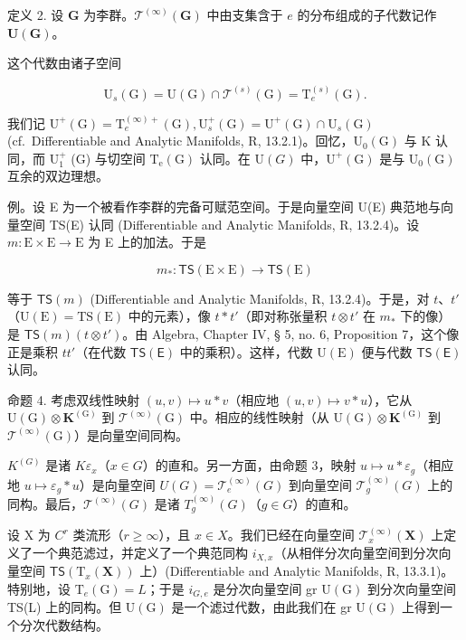 定义 2. 设 \(\mathbf{G}\) 为李群。\(\mathcal{T}^{(\infty)}(\mathbf{G})\) 中由支集含于 \(e\) 的分布组成的子代数记作 \(\mathbf{U}(\mathbf{G})\)。

这个代数由诸子空间

\[
\mathrm{U} _ {s} (\mathrm{G}) = \mathrm{U} (\mathrm{G}) \cap \mathcal {T} ^ {(s)} (\mathrm{G}) = \mathrm{T} _ {e} ^ {(s)} (\mathrm{G}).
\]

我们记 \(\mathrm{U}^{+}(\mathrm{G}) = \mathrm{T}_{e}^{(\infty)+}(\mathrm{G}),\mathrm{U}_{s}^{+}(\mathrm{G}) = \mathrm{U}^{+}(\mathrm{G})\cap \mathrm{U}_{s}(\mathrm{G})\) (cf.~Differentiable and Analytic Manifolds, R, 13.2.1)。回忆，\(\mathrm{U}_0(\mathrm{G})\) 与 K 认同，而 \(\mathrm{U}_1^+\) (G) 与切空间 \(\mathrm{T_e(G)}\) 认同。在 \(\mathrm{U}(G)\) 中，\(\mathrm{U}^{+}(\mathrm{G})\) 是与 \(\mathrm{U}_0(\mathrm{G})\) 互余的双边理想。

例。设 E 为一个被看作李群的完备可赋范空间。于是向量空间 U(E) 典范地与向量空间 TS(E) 认同 (Differentiable and Analytic Manifolds, R, 13.2.4)。设 \(m: \mathrm{E} \times \mathrm{E} \to \mathrm{E}\) 为 E 上的加法。于是

\[
m _ {*} \colon \mathsf {T S} (\mathrm{E} \times \mathrm{E}) \rightarrow \mathsf {T S} (\mathrm{E})
\]

等于 \(\mathsf{TS}(m)\) (Differentiable and Analytic Manifolds, R, 13.2.4)。于是，对 \(t\)、\(t'\)（\(\mathrm{U(E)} = \mathrm{TS(E)}\) 中的元素），像 \(t * t'\)（即对称张量积 \(t \otimes t'\) 在 \(m_*\) 下的像）是 \(\mathsf{TS}(m)(t \otimes t')\)。由 Algebra, Chapter IV, § 5, no. 6, Proposition 7，这个像正是乘积 \(tt'\)（在代数 \(\mathsf{TS(E)}\) 中的乘积）。这样，代数 \(\mathrm{U(E)}\) 便与代数 \(\mathsf{TS(E)}\) 认同。

命题 4. 考虑双线性映射 \((u,v)\mapsto u*v\)（相应地 \((u,v)\mapsto v*u\)），它从 \(\mathrm{U}(\mathrm{G})\otimes \mathbf{K}^{(\mathrm{G})}\) 到 \(\mathcal{T}^{(\infty)}(\mathrm{G})\) 中。相应的线性映射（从 \(\mathrm{U}(\mathrm{G})\otimes \mathbf{K}^{(\mathrm{G})}\) 到 \(\mathcal{T}^{(\infty)}(\mathrm{G})\)）是向量空间同构。

\(K^{(G)}\) 是诸 \(K\varepsilon_{x}\)（\(x\in G\)）的直和。另一方面，由命题 3，映射 \(u\mapsto u*\varepsilon_{g}\)（相应地 \(u\mapsto\varepsilon_{g}*u\)）是向量空间 \(U(G)=\mathcal{T}_{e}^{(\infty)}(G)\) 到向量空间 \(\mathcal{T}_{g}^{(\infty)}(G)\) 上的同构。最后，\(\mathcal{T}^{(\infty)}(G)\) 是诸 \(T_{g}^{(\infty)}(G)\)（\(g\in G\)）的直和。

设 X 为 \(C^{r}\) 类流形（\(r \geqslant \infty\)），且 \(x \in X\)。我们已经在向量空间 \(\mathcal{T}_{x}^{(\infty)}(\mathbf{X})\) 上定义了一个典范滤过，并定义了一个典范同构 \(i_{X,x}\)（从相伴分次向量空间到分次向量空间 \(\mathsf{TS}(\mathrm{T}_{x}(\mathbf{X}))\) 上）(Differentiable and Analytic Manifolds, R, 13.3.1)。特别地，设 \(\mathrm{T}_{e}(\mathrm{G}) = L\)；于是 \(i_{G,e}\) 是分次向量空间 gr \(\mathrm{U}(\mathrm{G})\) 到分次向量空间 TS(L) 上的同构。但 \(\mathrm{U}(\mathrm{G})\) 是一个滤过代数，由此我们在 gr \(\mathrm{U}(\mathrm{G})\) 上得到一个分次代数结构。

